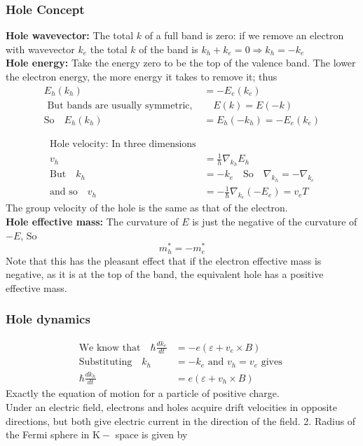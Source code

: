 \subsubsection{Hole Concept}
\textbf{Hole wavevector:} The total $k$ of a full band is zero: if we remove an electron with wavevector $k_{e}$ the total $k$ of the band is $k_{h}+k_{e}=0 \Rightarrow k_{h}=-k_{e}$\\
\textbf{Hole energy:} Take the energy zero to be the top of the valence band. The lower the electron energy, the more energy it takes to remove it; thus
\begin{align*}
E_{h}\left(k_{h}\right)&=-E_{e}\left(k_{e}\right)\\
\text { But bands are usually symmetric, }& \quad E(k)=E(-k)\\
\text{So}\quad E_{h}\left(k_{h}\right)&=E_{h}\left(-k_{h}\right)=-E_{e}\left(k_{e}\right)
\end{align*}

\begin{align*}
\text{Hole velocity: In three dimensions}\\
v_{h}&=\frac{1}{h} \nabla_{k_{h}} E_{h}\\
\text{But}\quad k_{h}&=-k_{e} \quad\text{So}\quad \nabla_{k_{h}}=-\nabla_{k_{e}}\\
\text{and so}\quad v_{h}&=-\frac{1}{\hbar} \nabla_{k_{e}}\left(-E_{e}\right)=v_{e}
T\end{align*}
The group velocity of the hole is the same as that of the electron.\\
\textbf{Hole effective mass:} The curvature of $E$ is just the negative of the curvature of $-E$,
So
$$
m_{h}^{*}=-m_{e}^{*}
$$
Note that this has the pleasant effect that if the electron effective mass is negative, as it is at the top of the band, the equivalent hole has a positive effective mass.
\subsubsection{Hole dynamics}
\begin{align*}
\text{We know that}\quad \hbar \frac{d k_{e}}{d t}&=-e\left(\varepsilon+v_{e} \times B\right)\\
\text{Substituting}\quad k_{h}&=-k_{e} \text { and } v_{h}=v_{e} \text { gives }\\
\hbar \frac{d k_{h}}{d t}&=e\left(\varepsilon+v_{h} \times B\right)
\end{align*}
Exactly the equation of motion for a particle of positive charge.\\
Under an electric field, electrons and holes acquire drift velocities in opposite directions, but both give electric current in the direction of the field. 2. Radius of the Fermi sphere in $\mathrm{K}-$ space is given by












